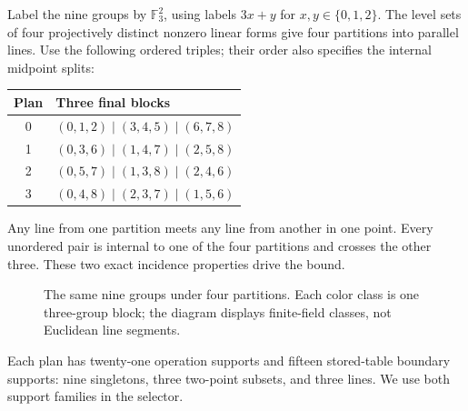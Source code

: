\documentclass[11pt]{article}
\theoremstyle{definition}\newtheorem{definition}[theorem]{Definition}
\theoremstyle{remark}\newtheorem{remark}[theorem]{Remark}
\newcommand{\F}{\mathbb F}
\begin{document}
Label the nine groups by $\F_3^2$, using labels $3x+y$ for
$x,y\in\{0,1,2\}$. The level sets of four projectively distinct nonzero
linear forms give four partitions into parallel lines. Use the following
ordered triples; their order also specifies the internal midpoint splits:
\begin{center}
\begin{tabular}{cl}
\toprule Plan & Three final blocks\\\midrule
0 & $(0,1,2)\mid(3,4,5)\mid(6,7,8)$\\
1 & $(0,3,6)\mid(1,4,7)\mid(2,5,8)$\\
2 & $(0,5,7)\mid(1,3,8)\mid(2,4,6)$\\
3 & $(0,4,8)\mid(2,3,7)\mid(1,5,6)$\\\bottomrule
\end{tabular}
\end{center}
Any line from one partition meets any line from another in one point.
Every unordered pair is internal to one of the four partitions and crosses
the other three. These two exact incidence properties drive the bound.

\begin{figure}[ht]
\centering
{}
\caption{The same nine groups under four partitions. Each color class is one
three-group block; the diagram displays finite-field classes, not Euclidean
line segments.}
\end{figure}

Each plan has twenty-one operation supports and fifteen stored-table
boundary supports: nine singletons, three two-point subsets, and three
lines. We use both support families in the selector.
\end{document}
